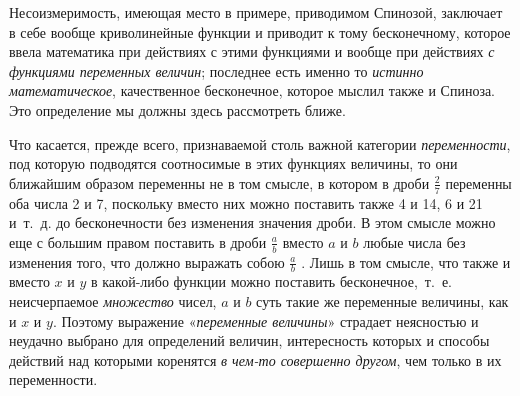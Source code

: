 Несоизмеримость, имеющая место в примере, приводимом Спинозой, заключает в
себе вообще криволинейные функции и приводит к тому бесконечному, которое
ввела математика при действиях с этими функциями и вообще при действиях
{\em с функциями переменных величин}; последнее есть
именно то {\em истинно математическое}, качественное
бесконечное, которое мыслил также и Спиноза. Это определение мы должны
здесь рассмотреть ближе.

Что касается, прежде всего, признаваемой столь важной категории
{\em переменности}, под которую подводятся соотносимые
в этих функциях величины, то они ближайшим образом переменны не в том
смысле, в котором в дроби  $\frac 2 7$  переменны оба числа 2 и 7,
поскольку вместо них можно поставить также 4 и 14, 6 и 21 и~т.~д. до
бесконечности без изменения значения дроби. В этом смысле можно еще с
большим правом поставить в дроби  $\frac a b$  вместо
$a$ и $b$ любые числа без
изменения того, что должно выражать собою  $\frac a b$ . Лишь в том смысле,
что также и вместо $x$ и
$y$ в какой-либо функции можно поставить
бесконечное,~т.~е. неисчерпаемое {\em множество} чисел,
$a$ и $b$ суть такие же
переменные величины, как и $x$ и
$y$. Поэтому выражение
«{\em переменные величины}» страдает неясностью и
неудачно выбрано для определений величин, интересность которых и способы
действий над которыми коренятся {\em в чем-то
совершенно другом}, чем только в их переменности.

